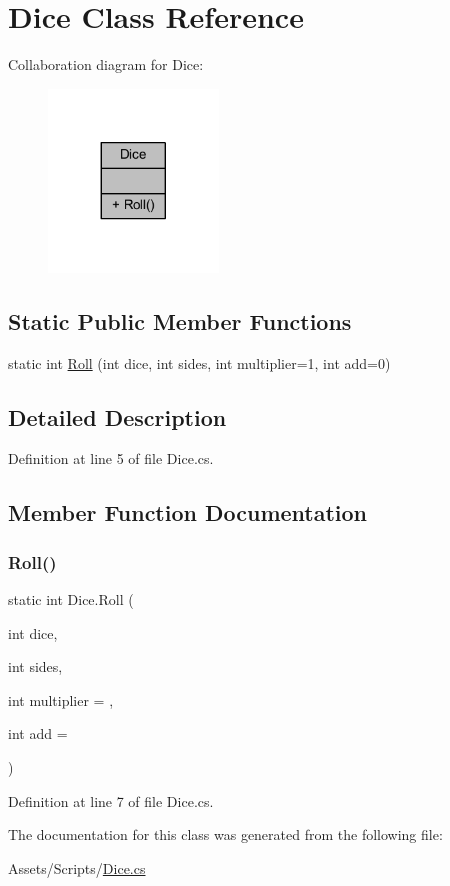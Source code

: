 \hypertarget{class_dice}{}\section{Dice Class Reference}
\label{class_dice}


Collaboration diagram for Dice\+:
\nopagebreak
\begin{figure}[H]
\begin{center}
\leavevmode
\includegraphics[width=128pt]{class_dice__coll__graph}
\end{center}
\end{figure}
\subsection*{Static Public Member Functions}
\begin{DoxyCompactItemize}
\item 
static int \mbox{\hyperlink{class_dice_a35ef280974d277d579faaec918e8cecc}{Roll}} (int dice, int sides, int multiplier=1, int add=0)
\end{DoxyCompactItemize}


\subsection{Detailed Description}


Definition at line 5 of file Dice.\+cs.



\subsection{Member Function Documentation}
\mbox{\label{class_dice_a35ef280974d277d579faaec918e8cecc}} 
\subsubsection{\texorpdfstring{Roll()}{Roll()}}
{\footnotesize\ttfamily static int Dice.\+Roll (\begin{DoxyParamCaption}\item[{int}]{dice,  }\item[{int}]{sides,  }\item[{int}]{multiplier = {},  }\item[{int}]{add = {} }\end{DoxyParamCaption})\hspace{0.3cm}{\ttfamily [static]}}



Definition at line 7 of file Dice.\+cs.



The documentation for this class was generated from the following file\+:\begin{DoxyCompactItemize}
\item 
Assets/\+Scripts/\mbox{\hyperlink{_dice_8cs}{Dice.\+cs}}\end{DoxyCompactItemize}
